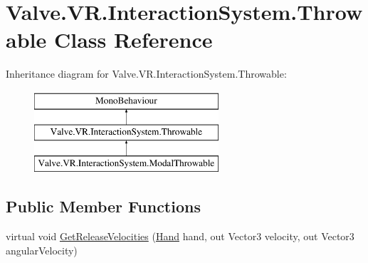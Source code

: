 \hypertarget{class_valve_1_1_v_r_1_1_interaction_system_1_1_throwable}{}\section{Valve.\+V\+R.\+Interaction\+System.\+Throwable Class Reference}
\label{class_valve_1_1_v_r_1_1_interaction_system_1_1_throwable}
Inheritance diagram for Valve.\+V\+R.\+Interaction\+System.\+Throwable\+:\begin{figure}[H]
\begin{center}
\leavevmode
\includegraphics[height=3.000000cm]{class_valve_1_1_v_r_1_1_interaction_system_1_1_throwable}
\end{center}
\end{figure}
\subsection*{Public Member Functions}
\begin{DoxyCompactItemize}
\item 
virtual void \mbox{\hyperlink{class_valve_1_1_v_r_1_1_interaction_system_1_1_throwable_a8ecf0e0de4937d710e4e4d8a6a717246}{Get\+Release\+Velocities}} (\mbox{\hyperlink{class_valve_1_1_v_r_1_1_interaction_system_1_1_hand}{Hand}} hand, out Vector3 velocity, out Vector3 angular\+Velocity)
\end{DoxyCompactItemize}
